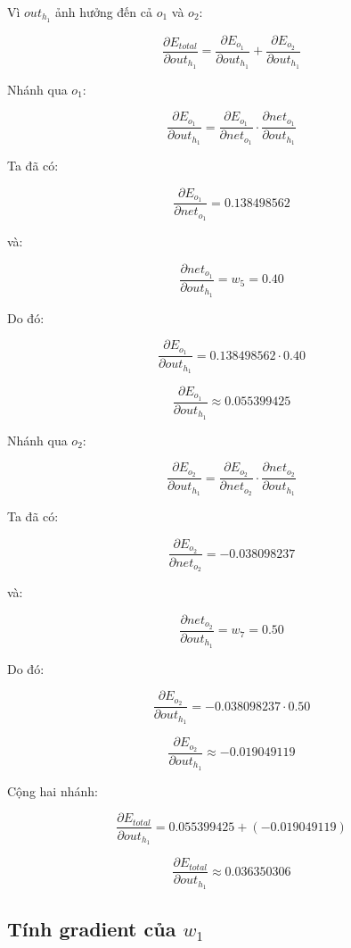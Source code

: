 Vì $out_{h_1}$ ảnh hưởng đến cả $o_1$ và $o_2$:

\[
    \frac{\partial E_{total}}{\partial out_{h_1}}
    =
    \frac{\partial E_{o_1}}{\partial out_{h_1}}
    +
    \frac{\partial E_{o_2}}{\partial out_{h_1}}
\]

Nhánh qua $o_1$:

\[
    \frac{\partial E_{o_1}}{\partial out_{h_1}}
    =
    \frac{\partial E_{o_1}}{\partial net_{o_1}}
    \cdot
    \frac{\partial net_{o_1}}{\partial out_{h_1}}
\]

Ta đã có:

\[
    \frac{\partial E_{o_1}}{\partial net_{o_1}}
    =
    0.138498562
\]

và:

\[
    \frac{\partial net_{o_1}}{\partial out_{h_1}}
    =
    w_5
    =
    0.40
\]

Do đó:

\[
    \frac{\partial E_{o_1}}{\partial out_{h_1}}
    =
    0.138498562\cdot 0.40
\]

\[
    \frac{\partial E_{o_1}}{\partial out_{h_1}}
    \approx 0.055399425
\]

Nhánh qua $o_2$:

\[
    \frac{\partial E_{o_2}}{\partial out_{h_1}}
    =
    \frac{\partial E_{o_2}}{\partial net_{o_2}}
    \cdot
    \frac{\partial net_{o_2}}{\partial out_{h_1}}
\]

Ta đã có:

\[
    \frac{\partial E_{o_2}}{\partial net_{o_2}}
    =
    -0.038098237
\]

và:

\[
    \frac{\partial net_{o_2}}{\partial out_{h_1}}
    =
    w_7
    =
    0.50
\]

Do đó:

\[
    \frac{\partial E_{o_2}}{\partial out_{h_1}}
    =
    -0.038098237\cdot 0.50
\]

\[
    \frac{\partial E_{o_2}}{\partial out_{h_1}}
    \approx -0.019049119
\]

Cộng hai nhánh:

\[
    \frac{\partial E_{total}}{\partial out_{h_1}}
    =
    0.055399425
    +
    (-0.019049119)
\]

\[
    \frac{\partial E_{total}}{\partial out_{h_1}}
    \approx 0.036350306
\]

\subsection{Tính gradient của $w_1$}

